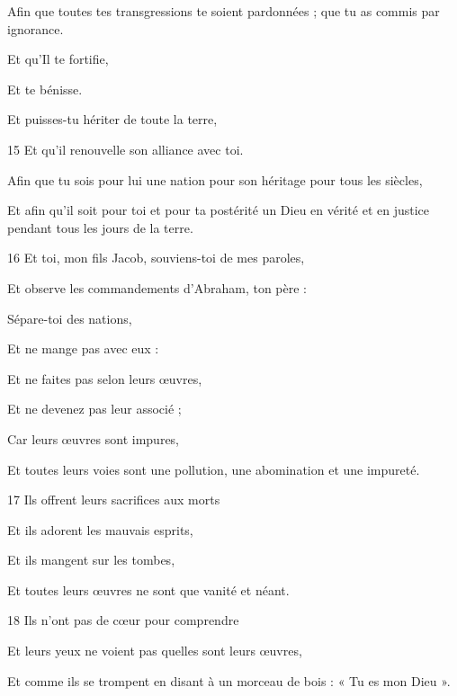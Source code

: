 \par     Afin que toutes tes transgressions te soient pardonnées ; que tu as commis par ignorance.
\par    
\par     Et qu'Il te fortifie,  
\par     Et te bénisse.  
\par     Et puisses-tu hériter de toute la terre,
\par    
\par 15 Et qu'il renouvelle son alliance avec toi.  
\par     Afin que tu sois pour lui une nation pour son héritage pour tous les siècles,  
\par     Et afin qu'il soit pour toi et pour ta postérité un Dieu en vérité et en justice pendant tous les jours de la terre.
\par    
\par 16 Et toi, mon fils Jacob, souviens-toi de mes paroles,  
\par     Et observe les commandements d'Abraham, ton père :
\par    
\par     Sépare-toi des nations,  
\par     Et ne mange pas avec eux :
\par    
\par     Et ne faites pas selon leurs œuvres,  
\par     Et ne devenez pas leur associé ;
\par    
\par     Car leurs œuvres sont impures,  
\par     Et toutes leurs voies sont une pollution, une abomination et une impureté.
\par    
\par 17 Ils offrent leurs sacrifices aux morts  
\par     Et ils adorent les mauvais esprits,
\par    
\par     Et ils mangent sur les tombes,  
\par     Et toutes leurs œuvres ne sont que vanité et néant.
\par    
\par 18 Ils n'ont pas de cœur pour comprendre  
\par     Et leurs yeux ne voient pas quelles sont leurs œuvres,
\par    
\par     Et comme ils se trompent en disant à un morceau de bois : « Tu es mon Dieu ».  

